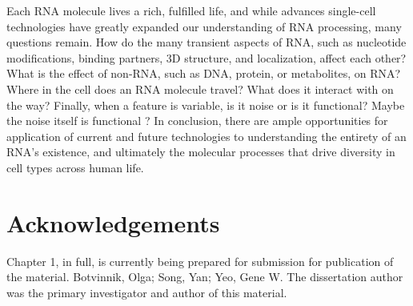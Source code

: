Each RNA molecule lives a rich, fulfilled life, and while advances single-cell technologies have greatly expanded our understanding of RNA processing, many questions remain. How do the many transient aspects of RNA, such as nucleotide modifications, binding partners, 3D structure, and localization, affect each other? What is the effect of non-RNA, such as DNA, protein, or metabolites, on RNA? Where in the cell does an RNA molecule travel? What does it interact with on the way? Finally, when a feature is variable, is it noise or is it functional? Maybe the noise itself is functional \cite{Arbel-Goren2014-iq,Dueck2016-mr,Symmons2016-xn}? In conclusion, there are ample opportunities for application of current and future technologies to understanding the entirety of an RNA's existence, and ultimately the molecular processes that drive diversity in cell types across human life.

\section{Acknowledgements}
Chapter 1, in full, is currently being prepared for submission for publication of the material. Botvinnik, Olga; Song, Yan; Yeo, Gene W. The dissertation author was the primary investigator and author of this material. 